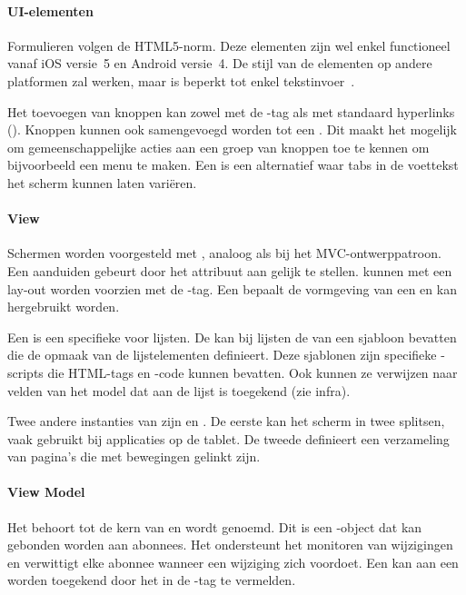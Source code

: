 \paragraph{UI-elementen}
Formulieren volgen de HTML5-norm. 
Deze elementen zijn wel enkel functioneel vanaf iOS versie~5 en Android versie~4.  
De stijl van de elementen op andere platformen zal werken, maar is beperkt tot enkel tekstinvoer~\cite{Telerike}.

Het toevoegen van knoppen kan zowel met de -tag als met standaard hyperlinks ().
Knoppen kunnen ook samengevoegd worden tot een .
Dit maakt het mogelijk om gemeenschappelijke acties aan een groep van knoppen toe te kennen om bijvoorbeeld een menu te maken.
Een  is een alternatief waar tabs in de voettekst het scherm kunnen laten variëren.

\paragraph{View}
Schermen worden voorgesteld met ,  analoog als bij het MVC-ontwerppatroon.
Een  aanduiden gebeurt door het attribuut  aan  gelijk te stellen.
 kunnen met een lay-out worden voorzien met de -tag.
Een  bepaalt de vormgeving van een  en kan hergebruikt worden.

Een  is een specifieke  voor lijsten.
De  kan bij lijsten de  van een sjabloon bevatten die de opmaak van de lijstelementen definieert.
Deze sjablonen zijn specifieke \kendo{}-scripts die HTML-tags en \js{}-code kunnen bevatten.
Ook kunnen ze verwijzen naar velden van het model dat aan de lijst is toegekend (zie infra).

Twee andere instanties van  zijn  en .
De eerste kan het scherm in twee  splitsen,  vaak gebruikt bij applicaties op de tablet.
De tweede definieert een verzameling van pagina's die met  bewegingen gelinkt zijn.

\paragraph{View Model}
Het  behoort tot de kern van \kendo{} en wordt  genoemd.
Dit is een \js{}-object dat kan gebonden worden aan abonnees.
Het ondersteunt het monitoren van wijzigingen en verwittigt elke abonnee wanneer een wijziging zich voordoet.
Een  kan aan een  worden toegekend door het in de -tag te vermelden.

